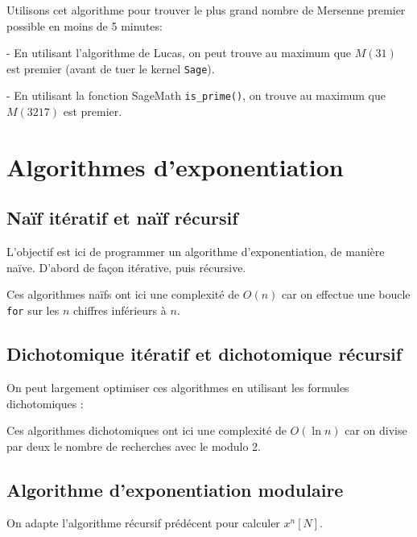 \documentclass[titlepage]{article}
\begin{document}
    Utilisons cet algorithme pour trouver le plus grand nombre de Mersenne premier possible en moins de 5 minutes:

    - En utilisant l'algorithme de Lucas, on peut trouve au maximum que $M(31)$ est premier (avant de tuer le kernel \texttt{Sage}).

    - En utilisant la fonction SageMath \texttt{is\_prime()}, on trouve au maximum que $M(3217)$ est premier.

    \section{Algorithmes d'exponentiation}
    \subsection{Naïf itératif et naïf récursif}
    L'objectif est ici de programmer un algorithme d'exponentiation, de manière naïve. D'abord de façon itérative, puis récursive.

    

    

    Ces algorithmes naïfs ont ici une complexité de $O(n)$ car on effectue une boucle \texttt{for} sur les $n$ chiffres inférieurs à $n$.

    \subsection{Dichotomique itératif et dichotomique récursif}

    On peut largement optimiser ces algorithmes en utilisant \- les formules dichotomiques : 

    

    

    Ces algorithmes dichotomiques ont ici une complexité de $O(\ln n)$ car on divise par deux le nombre de recherches avec le modulo 2.

    \subsection{Algorithme d'exponentiation modulaire}
    On adapte l'algorithme récursif prédécent pour calculer $x^n [N]$.
\end{document}
